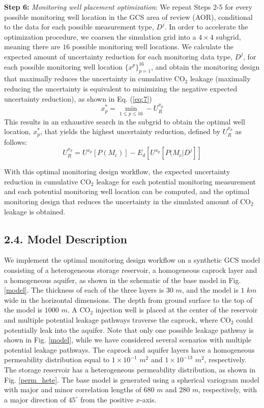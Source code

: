 \documentclass[10pt, twoside]{article}
\begin{document}
\textbf{Step 6:} \textit{Monitoring well placement optimization}: We repeat Steps 2-5 for every possible monitoring well location in the GCS area of review (AOR), conditional to the data for each possible measurement type, $D^j$. In order to accelerate the optimization procedure, we coarsen the simulation grid into a $4\times4$ subgrid, meaning there are $16$ possible monitoring well locations. We calculate the expected amount of uncertainty reduction for each monitoring data type, $D^j$, for each possible monitoring well location $\{{x^p}\}_{p=1}^{16}$, and obtain the monitoring design that maximally reduces the uncertainty in cumulative CO$_2$ leakage (maximally reducing the uncertainty is equivalent to minimizing the negative expected uncertainty reduction), as shown in Eq. (\ref{eq:7})
\begin{equation} \label{eq:7}
    x_p^* = \min\limits_{1\leq p \leq 16} -U_R^{x_p}
\end{equation}
This results in an exhaustive search in the subgrid to obtain the optimal well location, $x_p^*$, that yields the highest uncertainty reduction, defined by $U_R^{x_p}$ as follows:
\begin{equation} \label{eq:8}
    U_R^{x_p} = U^{x_p}[P(M_c)] - E_d[U^{x_p}[P(M_c \vert D^j]]
\end{equation}

With this optimal monitoring design workflow, the expected uncertainty reduction in cumulative CO$_2$ leakage for each potential monitoring measurement and each potential monitoring well location can be computed, and the optimal monitoring design that reduces the uncertainty in the simulated amount of CO$_2$ leakage is obtained.

\subsection*{2.4. Model Description}

We implement the optimal monitoring design workflow on a synthetic GCS model consisting of a heterogeneous storage reservoir, a homogeneous caprock layer and a homogeneous aquifer, as shown in the schematic of the base model in Fig. \ref{model}. The thickness of each of the three layers is $30$ $m$, and the model is $1$ $km$ wide in the horizontal dimensions. The depth from ground surface to the top of the model is $1000$ $m$. A CO$_2$ injection well is placed at the center of the reservoir and multiple potential leakage pathways traverse the caprock, where CO$_2$ could potentially leak into the aquifer. Note that only one possible leakage pathway is shown in Fig. \ref{model}, while we have considered several scenarios with multiple potential leakage pathways. The caprock and aquifer layers have a homogeneous permeability distribution equal to $1\times10^{-1}$ $m^2$ and $1\times10^{-13}$ $m^2$, respectively. The storage reservoir has a heterogeneous permeability distribution, as shown in Fig. \ref{perm_hete}. The base model is generated using a spherical variogram model \citep{Caers2005, Chen2017623} with major and minor correlation lengths of $680$ $m$ and $280$ $m$, respectively, with a major direction of $45^\circ$ from the positive $x$-axis.
\end{document}
